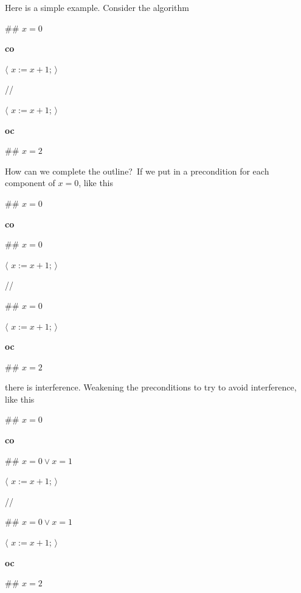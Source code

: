 \documentclass[11pt]{article}%
\begin{document}
Here is a simple example. Consider the algorithm

\begin{code}
\#\# $x=0$

\textbf{co}

\begin{indent}
\item $\langle$ $x:=x+1$; $\rangle$
\end{indent}

//

\begin{indent}
\item $\langle$ $x:=x+1$; $\rangle$
\end{indent}

\textbf{oc}

\#\# $x=2$
\end{code}

How can we complete the outline?\ If we put in a precondition for each
component of $x=0$, like this

\begin{code}
\#\# $x=0$

\textbf{co}

\begin{indent}
\item \#\# $x=0$

\item $\langle$ $x:=x+1$; $\rangle$
\end{indent}

//

\begin{indent}
\item \#\# $x=0$

\item $\langle$ $x:=x+1$; $\rangle$
\end{indent}

\textbf{oc}

\#\# $x=2$
\end{code}

\noindent there is interference. Weakening the preconditions to try to avoid
interference, like this

\begin{code}
\#\# $x=0$

\textbf{co}

\begin{indent}
\item \#\# $x=0\vee x=1$

\item $\langle$ $x:=x+1$; $\rangle$
\end{indent}

//

\begin{indent}
\item \#\# $x=0\vee x=1$

\item $\langle$ $x:=x+1$; $\rangle$
\end{indent}

\textbf{oc}

\#\# $x=2$
\end{code}
\end{document}
